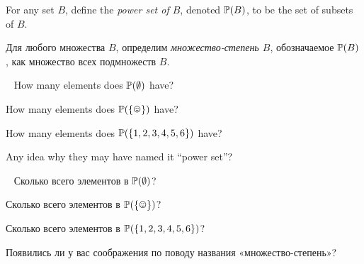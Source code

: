 \documentclass[CT4S-EN-RU]{subfiles}
\begin{document}
\begin{definitionENG}\label{def:power set}
For any set $B$, define the {\em power set of $B$}, denoted ${\mathbb P}(B)$, to be the set of subsets of $B$.
\end{definitionENG}

\begin{definitionRUS}\label{def:power set}
Для любого множества $B$, определим {\em множество-степень $B$}, обозначаемое ${\mathbb P}(B)$, как множество всех подмножеств $B$.
\end{definitionRUS}

\begin{exerciseENG}\label{exc:size of power sets}~
\sexc How many elements does ${\mathbb P}(\emptyset)$ have? 
\item How many elements does $\PP(\singleton)$ have? 
\item How many elements does ${\mathbb P}(\{1,2,3,4,5,6\})$ have? 
\item Any idea why they may have named it “power set”?
\endsexc
\end{exerciseENG}

\begin{exerciseRUS}\label{exc:size of power sets}~
\sexc Сколько всего элементов в ${\mathbb P}(\emptyset)$? 
\item Сколько всего элементов в $\PP(\singleton)$? 
\item Сколько всего элементов в ${\mathbb P}(\{1,2,3,4,5,6\})$? 
\item Появились ли у вас соображения по поводу названия «множество-степень»?
\endsexc
\end{exerciseRUS}


\subsubsection{}\label{sec:simplicial complex}
\end{document}
